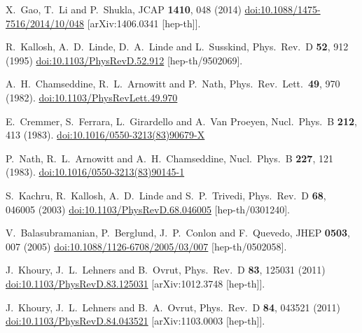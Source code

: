 \documentclass[12pt]{article}
\begin{document}
\begin{thebibliography}{99}
  X.~Gao, T.~Li and P.~Shukla,
  JCAP {\bf 1410}, 048 (2014)
  \href{https://dx.doi.org/10.1088/1475-7516/2014/10/048}{doi:10.1088/1475-7516/2014/10/048}
  [arXiv:1406.0341 [hep-th]].

  R.~Kallosh, A.~D.~Linde, D.~A.~Linde and L.~Susskind,
  Phys.\ Rev.\ D {\bf 52}, 912 (1995)
  \href{https://dx.doi.org/10.1103/PhysRevD.52.912}{doi:10.1103/PhysRevD.52.912}
  [hep-th/9502069].

  A.~H.~Chamseddine, R.~L.~Arnowitt and P.~Nath,
  Phys.\ Rev.\ Lett.\  {\bf 49}, 970 (1982).
  \href{https://dx.doi.org/10.1103/PhysRevLett.49.970}{doi:10.1103/PhysRevLett.49.970}

  E.~Cremmer, S.~Ferrara, L.~Girardello and A.~Van Proeyen,
  Nucl.\ Phys.\ B {\bf 212}, 413 (1983).
  \href{https://dx.doi.org/10.1016/0550-3213(83)90679-X}{doi:10.1016/0550-3213(83)90679-X}

  P.~Nath, R.~L.~Arnowitt and A.~H.~Chamseddine,
  Nucl.\ Phys.\ B {\bf 227}, 121 (1983).
  \href{https://dx.doi.org/10.1016/0550-3213(83)90145-1}{doi:10.1016/0550-3213(83)90145-1}

  S.~Kachru, R.~Kallosh, A.~D.~Linde and S.~P.~Trivedi,
  Phys.\ Rev.\ D {\bf 68}, 046005 (2003)
  \href{https://dx.doi.org/10.1103/PhysRevD.68.046005}{doi:10.1103/PhysRevD.68.046005}
  [hep-th/0301240].

  V.~Balasubramanian, P.~Berglund, J.~P.~Conlon and F.~Quevedo,
  JHEP {\bf 0503}, 007 (2005)
  \href{https://dx.doi.org/10.1088/1126-6708/2005/03/007}{doi:10.1088/1126-6708/2005/03/007}
  [hep-th/0502058].

  J.~Khoury, J.~L.~Lehners and B.~Ovrut,
  Phys.\ Rev.\ D {\bf 83}, 125031 (2011)
  \href{https://dx.doi.org/10.1103/PhysRevD.83.125031}{doi:10.1103/PhysRevD.83.125031}
  [arXiv:1012.3748 [hep-th]].

  J.~Khoury, J.~L.~Lehners and B.~A.~Ovrut,
  Phys.\ Rev.\ D {\bf 84}, 043521 (2011)
  \href{https://dx.doi.org/10.1103/PhysRevD.84.043521}{doi:10.1103/PhysRevD.84.043521}
  [arXiv:1103.0003 [hep-th]].


\end{thebibliography}
\end{document}
